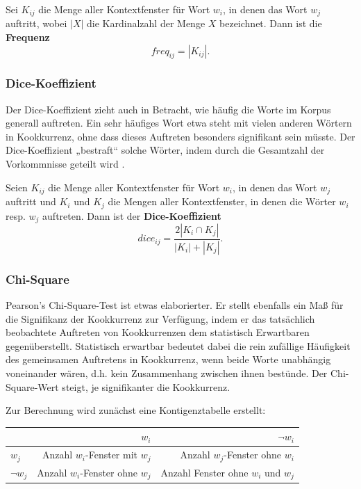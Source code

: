 \documentclass[11pt,numbers=noenddot]{scrartcl}
\begin{document}
Sei $K_{ij}$ die Menge aller Kontextfenster für Wort $w_i$, in denen das Wort $w_j$ auftritt, wobei $|X|$ die Kardinalzahl der Menge $X$ bezeichnet. Dann ist die \textbf{Frequenz}
\begin{equation*}
   freq_{ij} = |K_{ij}|.
\end{equation*}

\subsubsection{Dice-Koeffizient} \label{dice}

Der Dice-Koeffizient zieht auch in Betracht, wie häufig die Worte im Korpus generall auftreten. Ein sehr häufiges Wort etwa steht mit vielen anderen Wörtern in Kookkurrenz, ohne dass dieses Auftreten besonders signifikant sein müsste. Der Dice-Koeffizient „bestraft“ solche Wörter, indem durch die Gesamtzahl der Vorkommnisse geteilt wird \citep[S. 299]{manning1999}.

Seien $K_{ij}$ die Menge aller Kontextfenster für Wort $w_i$, in denen das Wort $w_j$ auftritt und $K_{i}$ und $K_{j}$ die Mengen aller Kontextfenster, in denen die Wörter $w_i$ resp. $w_j$ auftreten. Dann ist der \textbf{Dice-Koeffizient}
\begin{equation*}
   dice_{ij} = \frac{2 |K_{i} \cap K_{j}| }{|K_{i}| + |K_{j}|}.
\end{equation*}

\subsubsection{Chi-Square} \label{chi}

Pearson's Chi-Square-Test ist etwas elaborierter. Er stellt ebenfalls ein Maß für die Signifikanz der Kookkurrenz zur Verfügung, indem er das tatsächlich beobachtete Auftreten von Kookkurrenzen dem statistisch Erwartbaren gegenüberstellt. Statistisch erwartbar bedeutet dabei die rein zufällige Häufigkeit des gemeinsamen Auftretens in Kookkurrenz, wenn beide Worte unabhängig voneinander wären, d.h. kein Zusammenhang zwischen ihnen bestünde. Der Chi-Square-Wert steigt, je signifikanter die Kookkurrenz.

Zur Berechnung wird zunächst eine Kontigenztabelle erstellt:
\begin{table}[h]
    \begin{center}
        \begin{tabular}{l|r|r}
                    & $w_i$ & $\neg w_i$ \\ \hline
            $w_j$ &  Anzahl $w_i$-Fenster mit $w_j$ & Anzahl $w_j$-Fenster ohne $w_i$\\ \hline
            $\neg w_j$ &  Anzahl $w_i$-Fenster ohne $w_j$ & Anzahl Fenster ohne $w_i$ und $w_j$
        \end{tabular}
    \end{center}
\end{table}
\end{document}
